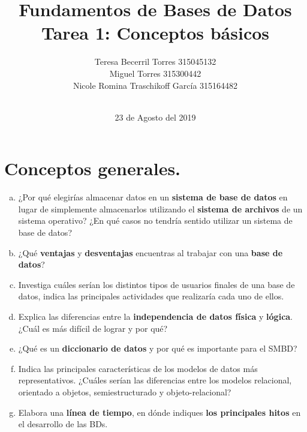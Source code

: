 \documentclass[12pt]{article}
\title{Fundamentos de Bases de Datos \\Tarea 1:     Conceptos básicos}
\author{Teresa Becerril Torres 315045132\\
        Miguel Torres 315300442\\
        Nicole Romina Traschikoff García 315164482\\
        \\}
\date{23 de Agosto del 2019}
\begin{document}
        \maketitle

    \section{Conceptos generales.}
          \begin{enumerate}[a. ]
            \item ¿Por qué elegirías almacenar datos en un \textbf{sistema de base de datos} en lugar de simplemente almacenarlos
            utilizando el \textbf{sistema de archivos} de un sistema operativo? ¿En qué casos no tendría sentido utilizar un sistema
            de base de datos?
            \item ¿Qué \textbf{ventajas} y \textbf{desventajas} encuentras al trabajar con una \textbf{base de datos}?
            \item Investiga cuáles serían los distintos tipos de usuarios finales de una base de datos, indica las principales
            actividades que realizaría cada uno de ellos.
            \item Explica las diferencias entre la \textbf{independencia de datos física} y \textbf{lógica}. ¿Cuál es más difícil de lograr y
            por qué?
            \item ¿Qué es un \textbf{diccionario de datos} y por qué es importante para el SMBD?
            \item Indica las principales características de los modelos de datos más representativos. ¿Cuáles serían las
            diferencias entre los modelos relacional, orientado a objetos, semiestructurado y objeto-relacional?
            \item Elabora una \textbf{línea de tiempo}, en dónde indiques \textbf{los principales hitos} en el desarrollo de las BDs.



\end{enumerate}
\end{document}
